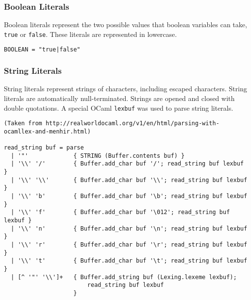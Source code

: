         \iffalse
        \subsubsection{Float Literals}
            Float literals represent floating point numbers, also expressed in decimal. They can use the dot (.) notation, exponential notation, or any combination of the two. 

            \begin{verbatim}
FLOAT = 
            \end{verbatim}
        \fi
        \subsubsection{Boolean Literals}
            Boolean literals represent the two possible values that boolean variables can take, \texttt{true} or \texttt{false}. These literals are represented in lowercase. 
            \begin{verbatim}
BOOLEAN = "true|false"
            \end{verbatim}

        \subsubsection{String Literals}
            String literals represent strings of characters, including escaped characters. String literals are automatically null-terminated. Strings are opened and closed with double quotations. A special OCaml \texttt{lexbuf} was used to parse string literals. 

            \begin{verbatim}
(Taken from http://realworldocaml.org/v1/en/html/parsing-with-ocamllex-and-menhir.html)

read_string buf = parse
  | '"'             { STRING (Buffer.contents buf) }
  | '\\' '/'        { Buffer.add_char buf '/'; read_string buf lexbuf }
  | '\\' '\\'       { Buffer.add_char buf '\\'; read_string buf lexbuf }
  | '\\' 'b'        { Buffer.add_char buf '\b'; read_string buf lexbuf }
  | '\\' 'f'        { Buffer.add_char buf '\012'; read_string buf lexbuf }
  | '\\' 'n'        { Buffer.add_char buf '\n'; read_string buf lexbuf }
  | '\\' 'r'        { Buffer.add_char buf '\r'; read_string buf lexbuf }
  | '\\' 't'        { Buffer.add_char buf '\t'; read_string buf lexbuf }
  | [^ '"' '\\']+   { Buffer.add_string buf (Lexing.lexeme lexbuf);
                        read_string buf lexbuf
                    }
            \end{verbatim}


